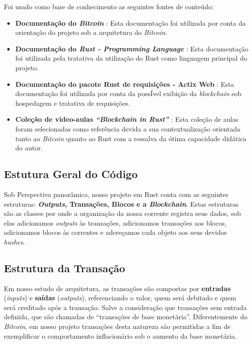 \documentclass[article,12pt,oneside,a4paper,english,brazil]{unifil}
\begin{document}
\begin{Spacing}{1.5}
Foi usado como base de conhecimento as seguintes fontes de conteúdo:
\begin{itemize}
    \item \textbf{Documentação do \textit{Bitcoin}} \cite{nakamoto2008bitcoin}: Esta documentação foi utilizada por conta da orientação do projeto sob a arquitetura do \textit{Bitcoin}.

    \item \textbf{Documentação do \textit{Rust - Programming Language}} \cite{rust_learn}: Esta documentação foi utilizada pela tratativa da utilização do Rust como linguagem principal do projeto.

    \item \textbf{Documentação do pacote Rust de requisições - Actix Web} \cite{actix_docs}: Esta documentação foi utilizada por conta da possÍvel exibição da \textit{blockchain} sob hospedagem e tratativa de requisições.

    \item \textbf{Coleção de video-aulas \textit{``Blockchain in Rust''}} \cite{geeklaunch_rust}: Esta coleção de aulas foram selecionadas como referência devida a sua contextualização orientada tanto ao \textit{Bitcoin} quanto ao Rust com a ressalva da ótima capacidade didática do autor.
\end{itemize}

\subsection*{Estutura Geral do Código}

Sob Perspectiva panorâmica, nosso projeto em Rust conta com as seguintes estruturas: \textbf{\textit{Outputs}, Transações, Blocos e a \textit{Blockchain}}. Estas estruturas são as classes por onde a organização da nossa corrente registra seus dados, sob elas adicionamos \textit{outputs} às transações, adicionamos transações aos blocos, adicionamos blocos às correntes e adereçamos cada objeto aos seus devidos \textit{hashes}.

\subsection*{Estrutura da Transação}

Em nosso estudo de arquitetura, as transações são compostas por
\textbf{entradas} (\textit{inputs}) e \textbf{saídas} (\textit{outputs}), referenciando o valor, quem será debitado e quem será creditado após a transação. Salve a consideração que transações sem entrada definida, que são chamadas de ``transações de base monetária''. Diferentemente do \textit{Bitcoin}, em nosso projeto transações desta natureza são permitidas a fim de exemplificar o comportamento inflacionário sob o aumento da base monetária.


\end{Spacing}
\end{document}
